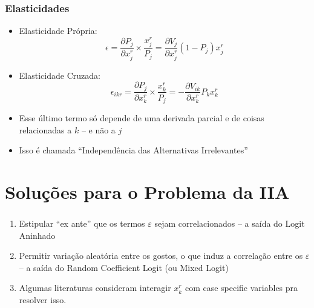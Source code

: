 \documentclass{beamer}
\begin{document}
\begin{frame}[fragile]\frametitle{Elasticidades}
    \begin{itemize}
    	\item Elasticidade Própria:
		\[
		\epsilon = \frac{\partial P_{j}}{\partial x_{j}^{r}} \times \frac{x_{j}^{r}}{P_{j}}= \frac{\partial V_{j}}{\partial x_{j}^{r}}(1-P_{j})x_{j}^ {r}
		\]
		\item Elasticidade Cruzada:
		\[
		\epsilon_{ikr}=\frac{\partial P_{j}}{\partial x_{k}^{r}}\times\frac{x_{k}^{r}}{P_{j}}=- \frac{\partial V_{ik}}{\partial x_{k}^{r}}P_{k}x_{k}^{r}
		\]
		\item Esse último termo só depende de uma derivada parcial e de coisas relacionadas a $k$ -- e não a $j$
		\item Isso é chamada ``Independência das Alternativas Irrelevantes''
    \end{itemize}


\end{frame}

\section{Soluções para o Problema da IIA}
\begin{frame}[fragile]\frametitle{\insertsection}
	\begin{enumerate}
    	\item Estipular ``ex ante'' que os termos $\varepsilon$ sejam correlacionados -- a saída do Logit Aninhado
    	\item Permitir variação aleatória entre os gostos, o que induz a correlação entre os $\varepsilon$ -- a saída do Random Coefficient Logit (ou Mixed Logit)
    	\item Algumas literaturas consideram interagir $x_{k}^{r}$ com case specific variables pra resolver isso.
    \end{enumerate}    


\end{frame}
\end{document}
